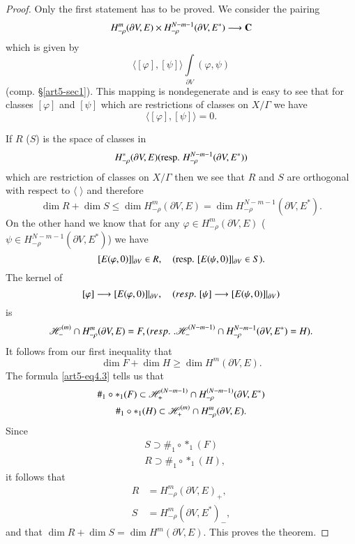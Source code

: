 \begin{proof}
Only the first statement has to be proved. We consider the pairing
$$
H^m_{-\rho} (\partial V,E) \times H^{N-m-1}_{-\rho} (\partial V, E^\ast) \longrightarrow \mathbf{C}
$$
which is given by 
$$
\langle[\varphi], [\psi] \rangle \int\limits_{\partial V}  (\varphi, \psi)
$$
(comp. \S \ref{art5-sec1}). This mapping is nondegenerate and is easy to see that for classes $[\varphi]$ and $[\psi]$ which are restrictions of classes on $X/ \Gamma$ we have
$$
\langle [\varphi], [\psi] \rangle = 0.
$$

If $R$ (\resp $S$) is the space of classes in 
$$
H^\ast_{-\rho} (\partial V, E) (\text{{resp.}\kern.3em} H^{N-m-1}_{-\rho} (\partial V, E^\ast))
$$ 
which are restriction of classes on $X/ \Gamma$ then we see that $R$ and $S$ are orthogonal with respect to $\langle \;\rangle$ and therefore 
$$
\dim R + \dim S \leqslant \dim H^m_{-\rho} (\partial V, E) = \dim H^{N-m-1}_{-\rho} (\partial V, E^{\ast}).
$$
On the other hand we know that for any $\varphi \in H^m_{-\rho} (\partial V, E)$ (\resp $\psi \in H^{N-m-1}_{-\rho} (\partial V, E^\ast)$) we have
$$
[E(\varphi, 0)] |_{\partial V} \in R, \quad(\text{{resp.}\kern.3em}[E(\psi, 0)] |_{\partial V } \in S).
$$
The kernel of
$$
[\varphi] \longrightarrow  [E(\varphi, 0)] |_{\partial V}, \quad ({resp.}\kern.3em [\psi] \longrightarrow [E(\psi, 0)] |_{\partial V})
$$
is
$$
\mathscr{H}^{(m)}_- \cap H^m_{-\rho} (\partial V, E) = F, ({resp.}\kern.3em. \mathscr{H}^{(N-m -1)}_- \cap H^{N-m-1}_{-\rho} (\partial V, E^\ast) = H).
$$
It follows from our first inequality that
$$
\dim F + \dim H \geqslant \dim H^m (\partial V, E).
$$
The formula \eqref{art5-eq4.3} tells us that
\begin{gather*}
\#_1 \circ \ast_1 (F) \subset \mathscr{H}^{(N-m-1)}_+ \cap H^{(N-m-1)}_{-\rho} (\partial V, E^{\ast}) \\
\#_1 \circ \ast_1 (H) \subset \mathscr{H}^{(m)}_+ \cap H^m_{-\rho} (\partial V, E).
\end{gather*}
Since\pageoriginale
\begin{align*}
& S \supset \#_1 \circ \ast_1 (F)\\
& R \supset \#_1 \circ \ast_1 (H),
\end{align*}
it follows that
\begin{align*}
R & = H^m_{-\rho} (\partial V, E)_+,\\
S & = H^m_{-\rho} (\partial V, E^\ast)_-,
\end{align*}
and that $\dim R + \dim S = \dim H^m (\partial V, E)$. This proves the theorem.
\end{proof}

